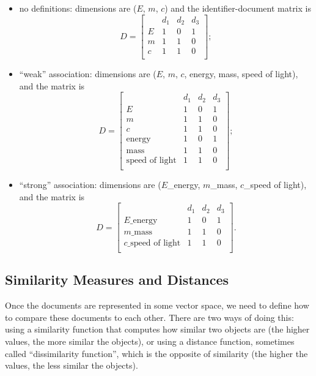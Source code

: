 \begin{itemize}\itemsep1pt\parskip0pt
  \item no definitions: dimensions are ($E$, $m$, $c$) and the identifier-document matrix is
  $$D = \left[
    \begin{array}{c|ccc}
       & d_1 & d_2 & d_3 \\
      \hline
      E & 1 & 0 & 1  \\
      m & 1 & 1 & 0 \\
      c & 1 & 1 & 0 \\
    \end{array}
  \right];$$
  \item ``weak'' association: dimensions are ($E$, $m$, $c$, energy, mass,
  speed of light), and the matrix is $$D = \left[
    \begin{array}{r|ccc}
       & d_1 & d_2 & d_3 \\
      \hline
      E                     & 1 & 0 & 1  \\
      m                     & 1 & 1 & 0 \\
      c                     & 1 & 1 & 0 \\
      \text{energy}         & 1 & 0 & 1  \\
      \text{mass}           & 1 & 1 & 0 \\
      \text{speed of light} & 1 & 1 & 0 \\
    \end{array}
  \right];$$
  \item ``strong'' association: dimensions are ($E$\_energy, $m$\_mass, $c$\_speed of light), and the matrix is $$D = \left[
    \begin{array}{r|ccc}
       & d_1 & d_2 & d_3 \\
      \hline
      E\text{\_energy} & 1 & 0 & 1  \\
      m\text{\_mass} & 1 & 1 & 0 \\
      c\text{\_speed of light} & 1 & 1 & 0 \\
    \end{array}
  \right].$$
\end{itemize}


\subsection{Similarity Measures and Distances} \label{sec:similarity-distance}

Once the documents are represented in some vector space, we need to
define how to compare these documents to each other. There are two
ways of doing this: using a similarity function that computes how similar
two objects are (the higher values, the more similar the objects),
or using a distance function, sometimes called ``dissimilarity function'',
which is the opposite of similarity (the higher the values, the less similar
the objects).

